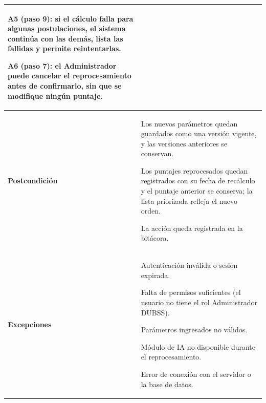 \begin{longtable}{>{\raggedright\arraybackslash}p{2.9cm} >{\raggedright\arraybackslash}p{12.6cm}}
\begin{cuvin}
    \item A5 (paso 9): si el cálculo falla para algunas postulaciones, el sistema continúa con las demás, lista las fallidas y permite reintentarlas.
    \item A6 (paso 7): el Administrador puede cancelar el reprocesamiento antes de confirmarlo, sin que se modifique ningún puntaje.
\end{cuvin} \\
\midrule
\textbf{Postcondición} & \vspace{-\baselineskip}\begin{cuvin}
    \item Los nuevos parámetros quedan guardados como una versión vigente, y las versiones anteriores se conservan.
    \item Los puntajes reprocesados quedan registrados con su fecha de recálculo y el puntaje anterior se conserva; la lista priorizada refleja el nuevo orden.
    \item La acción queda registrada en la bitácora.
\end{cuvin} \\
\midrule
\textbf{Excepciones} & \vspace{-\baselineskip}\begin{cuvin}
    \item Autenticación inválida o sesión expirada.
    \item Falta de permisos suficientes (el usuario no tiene el rol Administrador DUBSS).
    \item Parámetros ingresados no válidos.
    \item Módulo de IA no disponible durante el reprocesamiento.
    \item Error de conexión con el servidor o la base de datos.
\end{cuvin} \\
\end{longtable}
\endgroup
\addtocounter{table}{-1}
